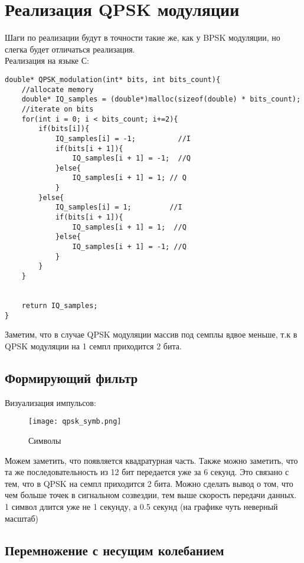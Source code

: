 \section*{\textbf{Реализация QPSK модуляции}}

Шаги по реализации будут в точности такие же, как у BPSK модуляции, но слегка будет отличаться реализация.\\

Реализация на языке С:

\begin{lstlisting}
double* QPSK_modulation(int* bits, int bits_count){
    //allocate memory
    double* IQ_samples = (double*)malloc(sizeof(double) * bits_count);
    //iterate on bits
    for(int i = 0; i < bits_count; i+=2){
        if(bits[i]){
            IQ_samples[i] = -1;          //I
            if(bits[i + 1]){
                IQ_samples[i + 1] = -1;  //Q
            }else{
                IQ_samples[i + 1] = 1; // Q
            }
        }else{
            IQ_samples[i] = 1;         //I
            if(bits[i + 1]){
                IQ_samples[i + 1] = 1;  //Q
            }else{
                IQ_samples[i + 1] = -1; //Q
            }
        }
    }


    return IQ_samples;
}
\end{lstlisting}

Заметим, что в случае QPSK модуляции массив под семплы вдвое меньше, т.к в QPSK модуляции на 1 семпл приходится 2 бита.

\subsection*{\textbf{Формирующий фильтр}}

Визуализация импульсов:

\begin{figure}[H]
    \centering
    \texttt{[image: qpsk\_symb.png]}
    \caption{Символы}
\end{figure}

Можем заметить, что появляется квадратурная часть. Также можно заметить, что та же последовательность из 12 бит передается уже
за 6 секунд. Это связано с тем, что в QPSK на семпл приходится 2 бита. Можно сделать вывод о том, что чем больше точек в сигнальном
созвездии, тем выше скорость передачи данных. 1 символ длится уже не 1 секунду, а 0.5 секунд (на графике чуть неверный масштаб)

\subsection*{\textbf{Перемножение с несущим колебанием}}

